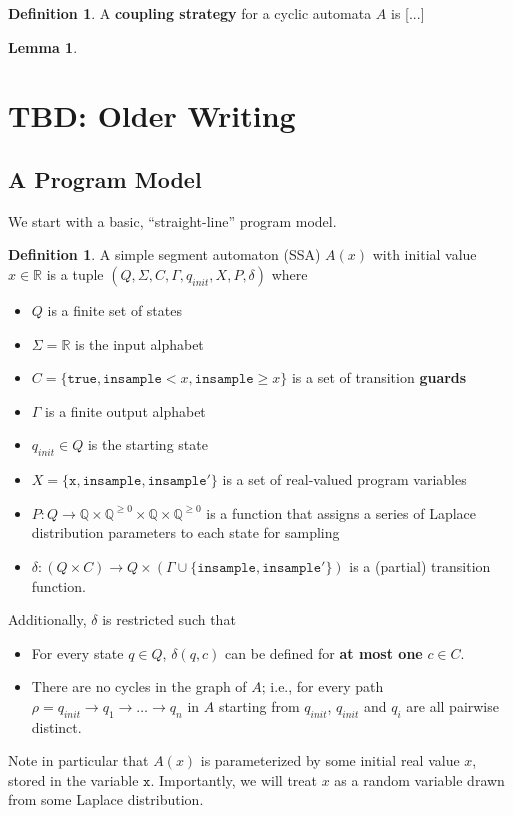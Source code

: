 \documentclass[12pt]{article}
\newcommand{\QQ}{\mathbb{Q}}
\newcommand{\RR}{\mathbb{R}}
\newcommand{\gguard}[1][x]{\texttt{insample}\geq #1}
\newcommand{\lguard}[1][x]{\texttt{insample} < #1}
\newtheorem{lemma}[thm]{Lemma}
\theoremstyle{definition}
\newtheorem{defn}[thm]{Definition}
\begin{document}
\begin{defn}
    A \textbf{coupling strategy} for a cyclic automata $A$ is [...]
\end{defn}

\begin{lemma}
    
\end{lemma}


\noindent\hrulefill

\section{TBD: Older Writing}
\subsection{A Program Model}

We start with a basic, ``straight-line'' program model. 

\begin{defn}\label{SSADefn}
    A simple segment automaton (SSA) $A(x)$ with initial value $x\in \RR$ is a tuple $(Q, \Sigma, C, \Gamma, q_{init}, X, P, \delta)$ where\begin{itemize}
        \item $Q$ is a finite set of states
        \item $\Sigma = \RR$ is the input alphabet
        \item $C = \{\texttt{true}, \lguard, \gguard\}$ is a set of transition \textbf{guards}
        \item $\Gamma$ is a finite output alphabet
        \item $q_{init}\in Q$ is the starting state
        \item $X = \{\texttt{x}, \texttt{insample}, \texttt{insample}'\}$ is a set of real-valued program variables
        \item $P: Q\to \QQ\times \QQ^{\geq 0}\times \QQ\times  \QQ^{\geq 0}$ is a function that assigns a series of Laplace distribution parameters to each state for sampling
        \item $\delta: (Q\times C)\to Q\times (\Gamma\cup\{\texttt{insample}, \texttt{insample}'\})$ is a (partial) transition function. 
    \end{itemize}
    Additionally, $\delta$ is restricted such that \begin{itemize}  
        \item For every state $q\in Q$,  $\delta(q, c)$ can be defined for \textbf{at most one} $c\in C$. 
        \item There are no cycles in the graph of $A$; i.e., for every path $\rho = q_{init} \to q_1\to\ldots\to q_n$ in $A$ starting from $q_{init}$, $q_{init}$ and $q_i$ are all pairwise distinct. 
    \end{itemize}

    Note in particular that $A(x)$ is parameterized by some initial real value $x$, stored in the variable $\texttt{x}$. Importantly, we will treat $x$ as a random variable drawn from some Laplace distribution.
\end{defn}
\end{document}
